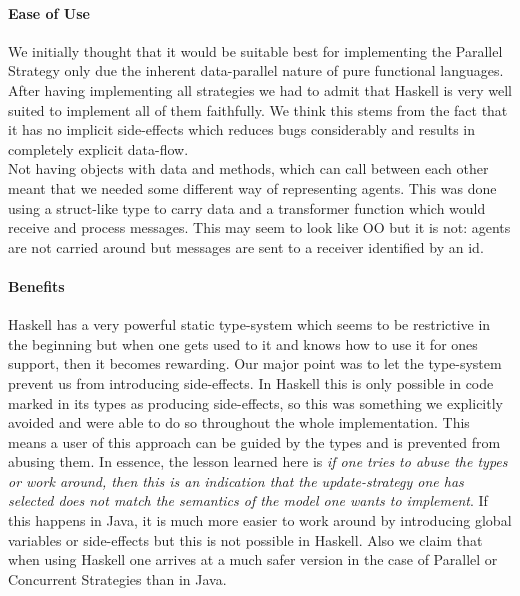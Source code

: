 \paragraph{Ease of Use}
We initially thought that it would be suitable best for implementing the Parallel Strategy only due the inherent data-parallel nature of pure functional languages. After having implementing all strategies we had to admit that Haskell is very well suited to implement all of them faithfully. We think this stems from the fact that it has no implicit side-effects which reduces bugs considerably and results in completely explicit data-flow. \\

Not having objects with data and methods, which can call between each other meant that we needed some different way of representing agents. This was done using a struct-like type to carry data and a transformer function which would receive and process messages. This may seem to look like OO but it is not: agents are not carried around but messages are sent to a receiver identified by an id.

\paragraph{Benefits}
Haskell has a very powerful static type-system which seems to be restrictive in the beginning but when one gets used to it and knows how to use it for ones support, then it becomes rewarding. Our major point was to let the type-system prevent us from introducing side-effects. In Haskell this is only possible in code marked in its types as producing side-effects, so this was something we explicitly avoided and were able to do so throughout the whole implementation. This means a user of this approach can be guided by the types and is prevented from abusing them. In essence, the lesson learned here is \textit{if one tries to abuse the types or work around, then this is an indication that the update-strategy one has selected does not match the semantics of the model one wants to implement}. If this happens in Java, it is much more easier to work around by introducing global variables or side-effects but this is not possible in Haskell. Also we claim that when using Haskell one arrives at a much safer version in the case of Parallel or Concurrent Strategies than in Java.\\

